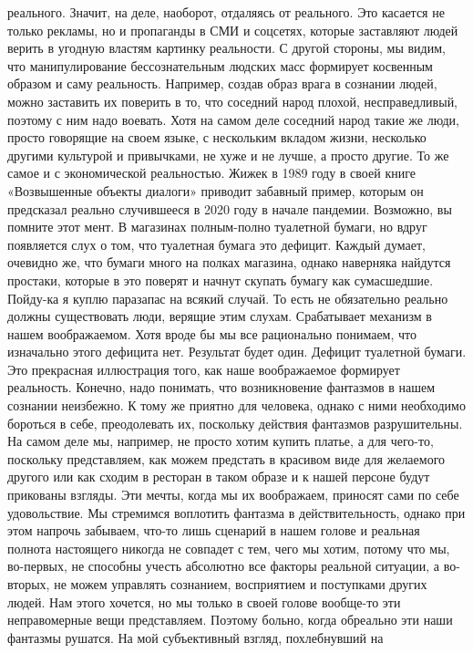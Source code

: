 реального. Значит, на деле, наоборот, отдаляясь от реального. Это касается не
только рекламы, но и пропаганды в СМИ и соцсетях, которые заставляют людей
верить в угодную властям картинку реальности. С другой стороны, мы видим, что
манипулирование бессознательным людских масс формирует косвенным образом и саму
реальность. Например, создав образ врага в сознании людей, можно заставить их
поверить в то, что соседний народ плохой, несправедливый, поэтому с ним надо
воевать. Хотя на самом деле соседний народ такие же люди, просто говорящие на
своем языке, с нескольким вкладом жизни, несколько другими культурой и
привычками, не хуже и не лучше, а просто другие. То же самое и с экономической
реальностью. Жижек в 1989 году в своей книге «Возвышенные объекты диалоги»
приводит забавный пример, которым он предсказал реально случившееся в 2020 году
в начале пандемии. Возможно, вы помните этот мент. В магазинах полным-полно
туалетной бумаги, но вдруг появляется слух о том, что туалетная бумага это
дефицит. Каждый думает, очевидно же, что бумаги много на полках магазина, однако
наверняка найдутся простаки, которые в это поверят и начнут скупать бумагу как
сумасшедшие. Пойду-ка я куплю паразапас на всякий случай. То есть не обязательно
реально должны существовать люди, верящие этим слухам. Срабатывает механизм в
нашем воображаемом. Хотя вроде бы мы все рационально понимаем, что изначально
этого дефицита нет. Результат будет один. Дефицит туалетной бумаги. Это
прекрасная иллюстрация того, как наше воображаемое формирует реальность.
Конечно, надо понимать, что возникновение фантазмов в нашем сознании неизбежно.
К тому же приятно для человека, однако с ними необходимо бороться в себе,
преодолевать их, поскольку действия фантазмов разрушительны. На самом деле мы,
например, не просто хотим купить платье, а для чего-то, поскольку представляем,
как можем предстать в красивом виде для желаемого другого или как сходим в
ресторан в таком образе и к нашей персоне будут прикованы взгляды. Эти мечты,
когда мы их воображаем, приносят сами по себе удовольствие. Мы стремимся
воплотить фантазма в действительность, однако при этом напрочь забываем, что-то
лишь сценарий в нашем голове и реальная полнота настоящего никогда не совпадет с
тем, чего мы хотим, потому что мы, во-первых, не способны учесть абсолютно все
факторы реальной ситуации, а во-вторых, не можем управлять сознанием,
восприятием и поступками других людей. Нам этого хочется, но мы только в своей
голове вообще-то эти неправомерные вещи представляем. Поэтому больно, когда
обреально эти наши фантазмы рушатся. На мой субъективный взгляд, похлебнувший на
